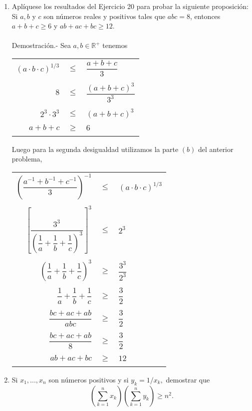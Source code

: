 \begin{enumerate}[ \bfseries 1.]
\item Aplíquese los resultados del Ejercicio 20 para probar la siguiente proposición: Si $a,b$ y $c$ son números reales y positivos tales que $abc=8$, entonces $a+b+c \geq 6$ y $ab +ac +bc \geq 12.$\\\\
Demostración.- \; Sea $a,b \in \mathbb{R}^+$ tenemos 
\begin{center}
\begin{tabular}{rcl}
$(a\cdot b \cdot c)^{1/3}$&$\leq$&$ \dfrac{a+b+c}{3} $\\\\
$8$&$\leq$&$\dfrac{(a+b+c)^3}{3^3}$\\\\
$2^3 \cdot 3^3$&$\leq$&$(a+b+c)^3$\\\\
$a+b+c$&$\geq$&$6$\\\\
\end{tabular}
\end{center}
Luego para la segunda desigualdad utilizamos la parte $(b)$ del anterior problema,
\begin{center}
\begin{tabular}{rcl}
$\left( \dfrac{a^{-1} + b^{-1} + c^{-1}}{3} \right)^{-1}$&$\leq$&$(a \cdot b \cdot c)^{1/3}$\\\\
$\left[ \dfrac{3^3}{\left( \dfrac{1}{a} + \dfrac{1}{b} + \dfrac{1}{c} \right)^3} \right] ^3$&$\leq$&$2^3$\\\\
$\left( \dfrac{1}{a} + \dfrac{1}{b} + \dfrac{1}{c} \right)^3$&$\geq $&$\dfrac{3^3}{2^3}$\\\\
$\dfrac{1}{a} + \dfrac{1}{b} + \dfrac{1}{c}$&$\geq$&$\dfrac{3}{2}$\\\\
$\dfrac{bc + ac + ab}{abc}$&$\geq$&$\dfrac{3}{2}$\\\\
$\dfrac{bc + ac + ab}{8}$&$\geq$&$\dfrac{3}{2}$\\\\
$ab+ac+bc$&$\geq$&$12$\\\\
\end{tabular}
\end{center}
\item Si $x_1,...,x_n$ son números positivos y si $y_k = 1/x_k,$ demostrar que $$\displaystyle \left( \sum_{k=1}^n x_k \right) \left( \sum_{k=1}^n y_k \right) \geq n^2.$$\\\\

\end{enumerate}
